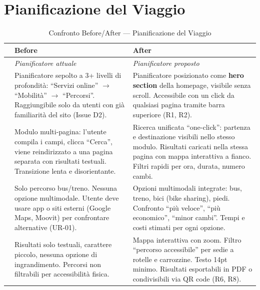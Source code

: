 \documentclass[11pt,a4paper]{article}
\begin{document}
\vspace{0.3cm}

\section{Pianificazione del Viaggio}

\begin{table}[H]
\centering
\small
\renewcommand{\arraystretch}{1.4}
\begin{tabular}{|p{0.5cm}|p{7cm}|p{7cm}|}
\hline
& \textbf{Before} & \textbf{After} \\ \hline
\cellcolor{primaryColor!15} &
\textit{Pianificatore attuale} &
\textit{Pianificatore proposto} \\ \hline

\raisebox{0.5cm}{\rotatebox{90}{\textbf{Posizione}}} &
Pianificatore sepolto a 3+ livelli di profondit\`a: ``Servizi online'' $\rightarrow$ ``Mobilit\`a'' $\rightarrow$ ``Percorsi''. Raggiungibile solo da utenti con gi\`a familiarit\`a del sito (Issue D2). &
Pianificatore posizionato come \textbf{hero section} della homepage, visibile senza scroll. Accessibile con un click da qualsiasi pagina tramite barra superiore (R1, R2). \\ \hline

\raisebox{0.5cm}{\rotatebox{90}{\textbf{Interazione}}} &
Modulo multi-pagina: l'utente compila i campi, clicca ``Cerca'', viene reindirizzato a una pagina separata con risultati testuali. Transizione lenta e disorientante. &
Ricerca unificata ``one-click'': partenza e destinazione visibili nello stesso modulo. Risultati caricati nella stessa pagina con mappa interattiva a fianco. Filtri rapidi per ora, durata, numero cambi. \\ \hline

\raisebox{0.5cm}{\rotatebox{90}{\textbf{Multimodalit\`a}}} &
Solo percorso bus/treno. Nessuna opzione multimodale. Utente deve usare app o siti esterni (Google Maps, Moovit) per confrontare alternative (UR-01). &
Opzioni multimodali integrate: bus, treno, bici (bike sharing), piedi. Confronto ``pi\`u veloce'', ``pi\`u economico'', ``minor cambi''. Tempi e costi stimati per ogni opzione. \\ \hline

\raisebox{0.5cm}{\rotatebox{90}{\textbf{Accessibilit\`a}}} &
Risultati solo testuali, carattere piccolo, nessuna opzione di ingrandimento. Percorsi non filtrabili per accessibilit\`a fisica. &
Mappa interattiva con zoom. Filtro ``percorso accessibile'' per sedie a rotelle e carrozzine. Testo 14pt minimo. Risultati esportabili in PDF o condivisibili via QR code (R6, R8). \\ \hline
\end{tabular}
\caption{Confronto Before/After --- Pianificazione del Viaggio}
\label{tab:comp-route}
\end{table}
\end{document}
